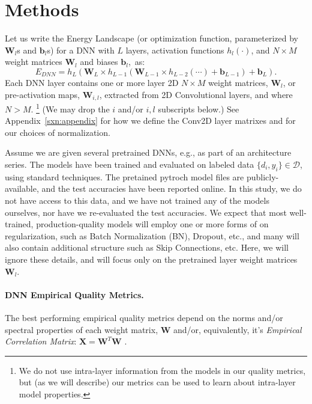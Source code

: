 \section{Methods}
\label{sxn:methods}


Let us write the Energy Landscape (or optimization function, parameterized by $\mathbf{W}_{l}$s and $\mathbf{b}_{l}$s) for a DNN with $L$ layers, activation functions $h_{l}(\cdot)$, and $N\times M$ weight matrices $\mathbf{W}_{l}$ and biases $\mathbf{b}_{l}$,~as:
\begin{equation}
E_{DNN}=h_{L}(\mathbf{W}_{L}\times h_{L-1}(\mathbf{W}_{L-1}\times h_{L-2}(\cdots)+\mathbf{b}_{L-1})+\mathbf{b}_{L})  .
\label{eqn:dnn_energy}
\end{equation}
Each DNN layer contains one or more layer 2D  $N\times M$ weight matrices, $\mathbf{W}_{l}$, or pre-activation maps, $\mathbf{W}_{i,l}$, extracted from 2D Convolutional layers, and where $N > M$.%
\footnote{We do not use intra-layer information from the models in our quality metrics, but (as we will describe) our metrics can be used to learn about intra-layer model properties.}
(We may drop the $i$ and/or $i,l$ subscripts below.)
See Appendix~\ref{sxn:appendix} for how we define the Conv2D layer matrixes and for our choices of normalization. 

Assume we are given several pretrained DNNs, e.g., as part of an architecture series.
The models have been trained and evaluated on labeled data $\{d_{i},y_{i}\}\in\mathcal{D}$, using standard techniques.  
The pretained pytroch model files are publicly-available, and the test accuracies have been reported online.  
In this study, we do not have access to this data, and we have not trained any of the models ourselves,
nor have we re-evaluated the test accuracies.
We expect that most well-trained, production-quality models will employ one or more forms of on regularization, such as Batch Normalization (BN), Dropout, etc., and many will also contain additional structure such as Skip Connections, etc. 
Here, we will ignore these details, and will focus only on the pretrained layer weight matrices $\mathbf{W}_{l}$.

\paragraph{DNN Empirical Quality Metrics.}

The best performing empirical quality metrics depend on the norms and/or spectral properties of each weight matrix,
$\mathbf{W}$ and/or, equivalently, it's \emph{Empirical Correlation Matrix}: $\mathbf{X}=\mathbf{W}^{T}\mathbf{W}$ .%

